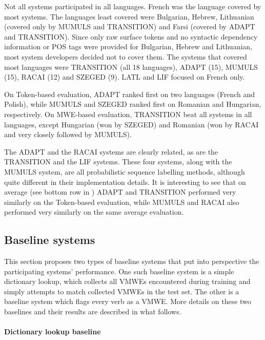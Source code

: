 \documentclass[output=paper
,modfonts
,nonflat,draftmode]{langsci/langscibook}
\begin{document}
Not all systems participated in all languages. French was the language covered by most systems. The languages least covered were Bulgarian, Hebrew, Lithuanian (covered only by MUMULS and TRANSITION) and Farsi (covered by ADAPT and TRANSITION). Since only raw surface tokens and no syntactic dependency information or POS tags were provided for Bulgarian, Hebrew and Lithuanian, most system developers decided not to cover them. The systems that covered most languages were TRANSITION (all 18 languages), ADAPT (15), MUMULS (15), RACAI (12) and SZEGED (9). LATL and LIF focused on French only. 

On Token-based evaluation, ADAPT ranked first on two languages (French and Polish), while MUMULS and SZEGED ranked first on Romanian and Hungarian, respectively. On MWE-based evaluation, TRANSITION beat all systems in all languages, except Hungarian (won by SZEGED) and Romanian (won by RACAI and very closely followed by MUMULS).

The ADAPT and the RACAI systems are clearly related, as are the TRANSITION and the LIF systems. These four systems, along with the MUMULS system, are all probabilistic sequence labelling methods, although quite different in their implementation details. It is interesting to see that on average (see bottom row in ) ADAPT and TRANSITION performed very similarly on the Token-based evaluation, while MUMULS and RACAI also performed very similarly on the same average evaluation. 



\subsection{\label{sec:baselines}Baseline systems}

This section proposes two types of baseline systems that put into perspective the participating systems' performance. One such baseline system is a simple dictionary lookup, which collects all VMWEs encountered during training and simply attempts to match collected VMWEs in the test set. The other is a baseline system which flags every verb as a VMWE. More details on these two baselines and their results are described in what follows. 

\paragraph*{Dictionary lookup baseline}
\end{document}
